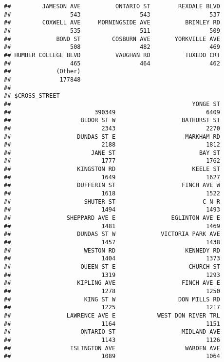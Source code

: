 \documentclass[]{article}
\begin{document}
\begin{verbatim}
##         JAMESON AVE          ONTARIO ST        REXDALE BLVD 
##                 543                 543                 537 
##         COXWELL AVE     MORNINGSIDE AVE          BRIMLEY RD 
##                 535                 511                 509 
##             BOND ST         COSBURN AVE       YORKVILLE AVE 
##                 508                 482                 469 
## HUMBER COLLEGE BLVD          VAUGHAN RD          TUXEDO CRT 
##                 465                 464                 462 
##             (Other) 
##              177848 
## 
## $CROSS_STREET
##                                                    YONGE ST 
##                        390349                          6409 
##                    BLOOR ST W                   BATHURST ST 
##                          2343                          2270 
##                   DUNDAS ST E                    MARKHAM RD 
##                          2188                          1812 
##                       JANE ST                        BAY ST 
##                          1777                          1762 
##                   KINGSTON RD                      KEELE ST 
##                          1649                          1627 
##                   DUFFERIN ST                   FINCH AVE W 
##                          1618                          1522 
##                     SHUTER ST                         C N R 
##                          1494                          1493 
##                SHEPPARD AVE E                EGLINTON AVE E 
##                          1481                          1469 
##                   DUNDAS ST W             VICTORIA PARK AVE 
##                          1457                          1438 
##                     WESTON RD                    KENNEDY RD 
##                          1404                          1373 
##                    QUEEN ST E                     CHURCH ST 
##                          1319                          1293 
##                   KIPLING AVE                   FINCH AVE E 
##                          1278                          1250 
##                     KING ST W                  DON MILLS RD 
##                          1225                          1217 
##                LAWRENCE AVE E            WEST DON RIVER TRL 
##                          1164                          1151 
##                    ONTARIO ST                   MIDLAND AVE 
##                          1143                          1126 
##                 ISLINGTON AVE                    WARDEN AVE 
##                          1089                          1064 

\end{verbatim}
\end{document}
